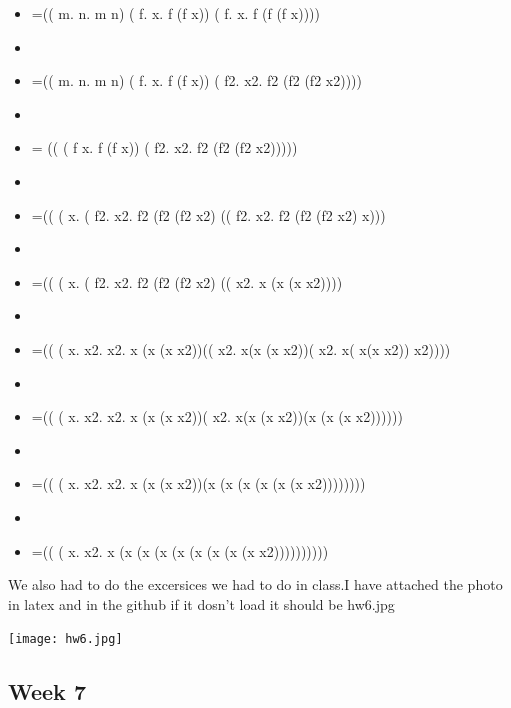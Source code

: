 \documentclass{article}
\theoremstyle{theorem}
\theoremstyle{definition}
\theoremstyle{remark}
\begin{document}
\begin{enumerate}
\begin{enumerate}
\begin{itemize}
\item =(( \lambda m. \lambda n. m n) ( \lambda f. \lambda x. f (f x)) ( \lambda f. \lambda x. f (f (f x))))
\item 
\item =(( \lambda m. \lambda n. m n) ( \lambda f. \lambda x. f (f x)) ( \lambda f2. \lambda x2. f2 (f2 (f2 x2))))
\item 
\item = (( ( \lambda f \lambda x. f (f x)) ( \lambda f2. \lambda x2. f2 (f2 (f2 x2)))))
\item 
\item =(( ( \lambda x. ( \lambda f2. \lambda x2. f2 (f2 (f2 x2) (( \lambda f2. \lambda x2. f2 (f2 (f2 x2) x)))
\item 
\item =(( ( \lambda x. ( \lambda f2. \lambda x2. f2 (f2 (f2 x2) (( \lambda x2. x (x (x x2))))
\item 
\item =(( ( \lambda x. \lambda x2. \lambda x2. x (x (x x2))(( \lambda x2. x(x (x x2))( \lambda x2. x( x(x x2)) x2))))
\item 
\item =(( ( \lambda x. \lambda x2. \lambda x2. x (x (x x2))( \lambda x2. x(x (x x2))(x (x (x x2))))))
\item 
\item =(( ( \lambda x. \lambda x2. \lambda x2. x (x (x x2))(x (x (x (x (x (x x2))))))))
\item 
\item =(( ( \lambda x. \lambda x2. x (x (x (x (x (x (x (x (x x2))))))))))
\end{itemize}
\end{enumerate}
We also had to do the excersices we had to do in class.I have attached the photo in latex and in the github if it dosn't load it should be hw6.jpg
\end{enumerate} 
\texttt{[image: hw6.jpg]}
\subsection{Week 7}
\end{document}
